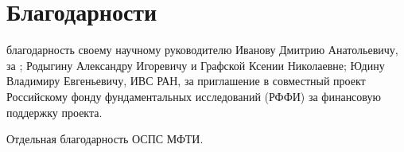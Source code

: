 \section{Благодарности}
 благодарность своему научному руководителю Иванову Дмитрию Анатольевичу, за ; Родыгину Александру Игоревичу и Графской Ксении Николаевне;
Юдину Владимиру Евгеньевичу, ИВС РАН, за приглашение в совместный проект
Российскому фонду фундаментальных исследований (РФФИ) за финансовую поддержку проекта.

Отдельная благодарность ОСПС МФТИ. 